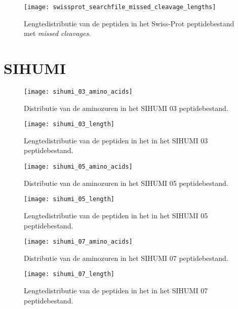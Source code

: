 \begin{figure}[H]
    \centering
    \texttt{[image: swissprot\_searchfile\_missed\_cleavage\_lengths]}
    \caption{Lengtedistributie van de peptiden in het Swiss-Prot peptidebestand met \textit{missed cleavages.}}
    \label{fig:swissprot_search_missed_cleavage_distr}
\end{figure}

\section{SIHUMI}\label{sec:sihumi-stats}

\begin{figure}[H]
    \centering
    \texttt{[image: sihumi\_03\_amino\_acids]}
    \caption{Distributie van de aminozuren in het SIHUMI 03 peptidebestand.}
    \label{fig:sihumi_03_amino_acids}
\end{figure}

\begin{figure}[H]
    \centering
    \texttt{[image: sihumi\_03\_length]}
    \caption{Lengtedistributie van de peptiden in het in het SIHUMI 03 peptidebestand.}
    \label{fig:sihumi_03_distr}
\end{figure}

\begin{figure}[H]
    \centering
    \texttt{[image: sihumi\_05\_amino\_acids]}
    \caption{Distributie van de aminozuren in het SIHUMI 05 peptidebestand.}
    \label{fig:sihumi_05_amino_acids}
\end{figure}

\begin{figure}[H]
    \centering
    \texttt{[image: sihumi\_05\_length]}
    \caption{Lengtedistributie van de peptiden in het in het SIHUMI 05 peptidebestand.}
    \label{fig:sihumi_05_distr}
\end{figure}

\begin{figure}[H]
    \centering
    \texttt{[image: sihumi\_07\_amino\_acids]}
    \caption{Distributie van de aminozuren in het SIHUMI 07 peptidebestand.}
    \label{fig:sihumi_07_amino_acids}
\end{figure}

\begin{figure}[H]
    \centering
    \texttt{[image: sihumi\_07\_length]}
    \caption{Lengtedistributie van de peptiden in het in het SIHUMI 07 peptidebestand.}
    \label{fig:sihumi_07_distr}
\end{figure}


